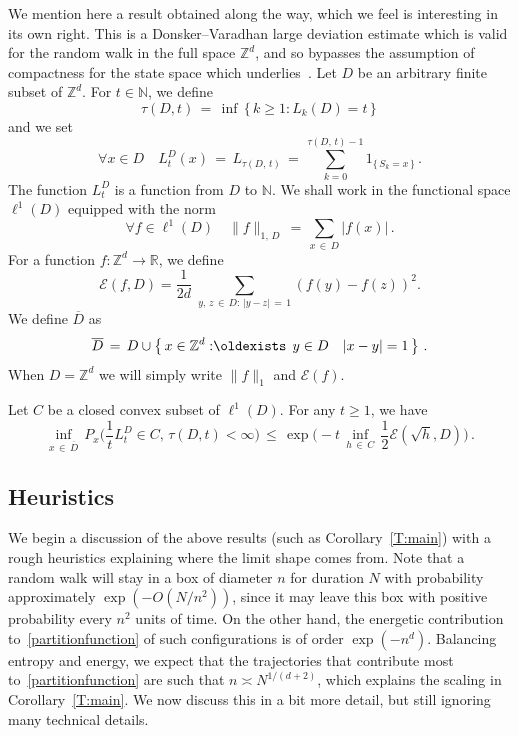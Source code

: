 \documentclass[AHL, Unicode, longabstracts, published]{cedram}
\newcommand*\bD{\overline{D}}
\newcommand*\Z {{\mathbb Z}}
\newcommand*\Zd {{\mathbb Z^d}}
\newcommand*\R{\mathbb{R}}
\newcommand*\N {{\mathbb N}}
\newcommand{\cE}{\mathcal{E}}
\renewcommand{\N}{\mathbb{N}}
\renewcommand*{\exists}{\mathrel{\oldexists}}
\let\oldforall\forall
\renewcommand*{\forall}{\mathrel{\oldforall}}
\begin{document}
We mention here a result obtained along the way, which we feel is interesting in its own right. This is a Donsker--Varadhan large deviation estimate which is valid for the random walk in the full space $\mathbb{Z}^d$, and so bypasses the assumption of compactness for the state space which underlies~\cite{DV1}. Let $D$ be an arbitrary finite subset of $\Zd$. For $t\in \N$, we define
\[
\tau(D,t)\,=\,\inf\,\big\{\,k\geq 1:L_k(D)=t\,\big\}\,
\]
and we set
\[
\forall x\in D\quad
L_t^D(x)\,=\,L_{\tau(D,\,t)}\,=\,\sum_{k=0}^{\tau(D,\,t)-1}1_{\{\,S_k=x\,\}}\,.
\]
The function $L_t^D$ is a function from $D$ to $\N$. We shall work in the functional space $\ell^1(D)$ equipped with the norm
\[
\forall f\in\ell^1(D)\quad
\|f\|_{1,\,D}\,=\,\sum_{x\,\in\,D}|f(x)|\,.
\]
For a function $f: \Z^d \to \R$, we define
\begin{equation}\label{defE}
\cE(f,D) = \frac1{2d}\;\sum_{y,\,z\,\in\,D:\,| y -z|\,=\,1} (f(y) - f(z))^2.
\end{equation}
We define $\bD$ as
\[
\bD\,=\,D\cup\left\{\,x\in\Zd:\exists\, y\in D\quad |x-y|=1\,\right\}\,.
\]
When $D = \Z^d$ we will simply write $\|f\|_1$ and $\cE(f)$.
\begin{theo}\label{GD}
Let $C$ be a closed convex subset of $\ell^1(D)$. For any $t\geq 1$, we have
\[
\inf_{x\,\in\,\bD}\,P_x\bigg(\frac{1}{t}L_t^D\in C,\,
\tau(D,t)<\infty\bigg)\,\leq\,
\exp\bigg(-t\,\inf_{h\,\in\,C}\,\frac{1}{2}\cE(\sqrt{h},D)
\bigg)
\,.
\]
\end{theo}



\subsection{Heuristics}

We begin a discussion of the above results (such as Corollary~\ref{T:main}) with a rough heuristics explaining where the limit shape comes from. Note that a random walk will stay in a box of diameter $n$ for duration $N$ with probability approximately $\exp(- O(N/n^2))$, since it may leave this box with positive probability every $n^2$ units of time. On the other hand, the energetic contribution to~\eqref{partitionfunction} of such configurations is of order $\exp (- n^d)$. Balancing entropy and energy, we expect that the trajectories that contribute most to~\eqref{partitionfunction} are such that $n \asymp N^{1/(d+2)}$, which explains the scaling in Corollary~\ref{T:main}. We now discuss this in a bit more detail, but still ignoring many technical details.
\end{document}
